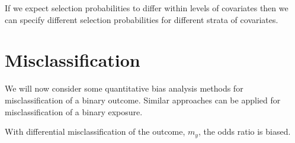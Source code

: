 \documentclass[
]{book}
\newenvironment{Shaded}{\begin{snugshade}}{\end{snugshade}}
\newcommand{\AttributeTok}[1]{\textcolor[rgb]{0.13,0.29,0.53}{#1}}
\newcommand{\CommentTok}[1]{\textcolor[rgb]{0.56,0.35,0.01}{\textit{#1}}}
\newcommand{\DecValTok}[1]{\textcolor[rgb]{0.00,0.00,0.81}{#1}}
\newcommand{\FloatTok}[1]{\textcolor[rgb]{0.00,0.00,0.81}{#1}}
\newcommand{\FunctionTok}[1]{\textcolor[rgb]{0.13,0.29,0.53}{\textbf{#1}}}
\newcommand{\NormalTok}[1]{#1}
\newcommand{\OtherTok}[1]{\textcolor[rgb]{0.56,0.35,0.01}{#1}}
\newcommand{\SpecialCharTok}[1]{\textcolor[rgb]{0.81,0.36,0.00}{\textbf{#1}}}
\begin{document}
\begin{Shaded}
\end{Shaded}

If we expect selection probabilities to differ within levels of covariates then we can specify different selection probabilities for different strata of covariates.

\hypertarget{misclassification}{%
\section{Misclassification}\label{misclassification}}

We will now consider some quantitative bias analysis methods for misclassification of a binary outcome. Similar approaches can be applied for misclassification of a binary exposure.

With differential misclassification of the outcome, \(m_y\), the odds ratio is biased.
\end{document}
